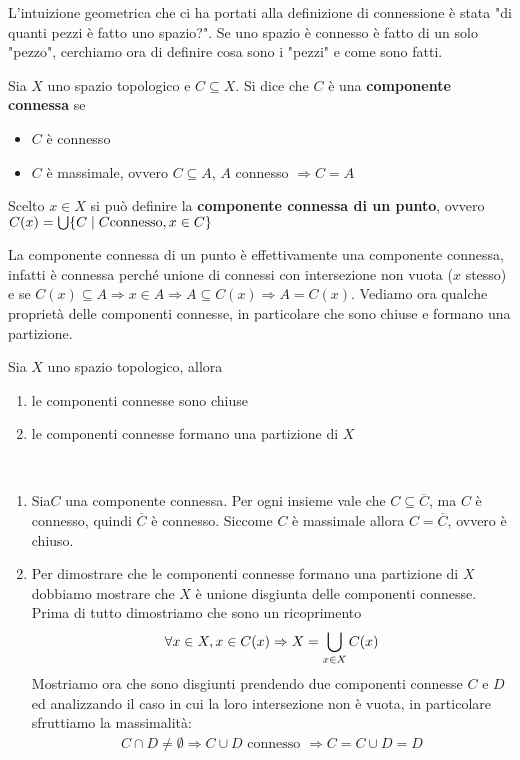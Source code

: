 L'intuizione geometrica che ci ha portati alla definizione di connessione è stata "di quanti pezzi è fatto uno spazio?". Se uno spazio è connesso è fatto di un solo "pezzo", cerchiamo ora di definire cosa sono i "pezzi" e come sono fatti.
\begin{define}
	Sia $X$ uno spazio topologico e $C\subseteq X$. Si dice che $C$ è una \textbf{componente connessa} se 
		\begin{itemize}
			\item $C$ è connesso
			\item $C$ è massimale, ovvero $C\subseteq A$, $A$ connesso $\Rightarrow C=A$
		\end{itemize}
	Scelto $x\in X$ si può definire la \textbf{componente connessa di un punto}, ovvero $C(x)=\mathop{{\bigcup}}\displaylimits \{C \mid C\text{connesso}, x\in C\}$
\end{define}
La componente connessa di un punto è effettivamente una componente connessa, infatti è connessa perché unione di connessi con intersezione non vuota ($x$ stesso) e se $C(x)\subseteq A \Rightarrow x\in A \Rightarrow A\subseteq C(x) \Rightarrow A=C(x)$.\newline
Vediamo ora qualche proprietà delle componenti connesse, in particolare che sono chiuse e formano una partizione.
\begin{theorema}
	Sia $X$ uno spazio topologico, allora
		\begin{enumerate}
			\item le componenti connesse sono chiuse
			\item le componenti connesse formano una partizione di $X$
		\end{enumerate}
\end{theorema}
\begin{demonstration}
	~{}
	\begin{enumerate}[label=\Roman*]
		\item Sia$C$ una componente connessa. Per ogni insieme vale che $C\subseteq\overline{C}$, ma $C$ è connesso, quindi $\overline{C}$ è connesso. Siccome $C$ è massimale allora $C=\overline{C}$, ovvero è chiuso.
		\item Per dimostrare che le componenti connesse formano una partizione di $X$ dobbiamo mostrare che $X$ è unione disgiunta delle componenti connesse. Prima di tutto dimostriamo che sono un ricoprimento
			\begin{equation*}
				\forall x\in X, x\in C(x) \Rightarrow X=\mathop{{\bigcup}}\displaylimits_{x\in X}C(x)
			\end{equation*}
		Mostriamo ora che sono disgiunti prendendo due componenti connesse $C$ e $D$ ed analizzando il caso in cui la loro intersezione non è vuota, in particolare sfruttiamo la massimalità:
		\begin{gather*}
			C\cap D\neq\emptyset \Rightarrow C\cup D \text{ connesso } \Rightarrow C=C\cup D=D
		\end{gather*}
	\end{enumerate}
\end{demonstration}

